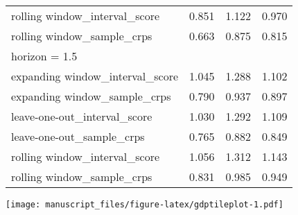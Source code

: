 \documentclass[
]{article}
\begin{document}
\begin{longtable}{l|rrr}
rolling window\_interval\_score & 0.851 & 1.122 & 0.970 \\ 
rolling window\_sample\_crps & 0.663 & 0.875 & 0.815 \\ 
\midrule
\multicolumn{4}{l}{horizon = 1.5} \\ 
\midrule
expanding window\_interval\_score & 1.045 & 1.288 & 1.102 \\ 
expanding window\_sample\_crps & 0.790 & 0.937 & 0.897 \\ 
leave-one-out\_interval\_score & 1.030 & 1.292 & 1.109 \\ 
leave-one-out\_sample\_crps & 0.765 & 0.882 & 0.849 \\ 
rolling window\_interval\_score & 1.056 & 1.312 & 1.143 \\ 
rolling window\_sample\_crps & 0.831 & 0.985 & 0.949 \\ 
\bottomrule
\end{longtable}

\texttt{[image: manuscript\_files/figure-latex/gdptileplot-1.pdf]}
\end{document}
